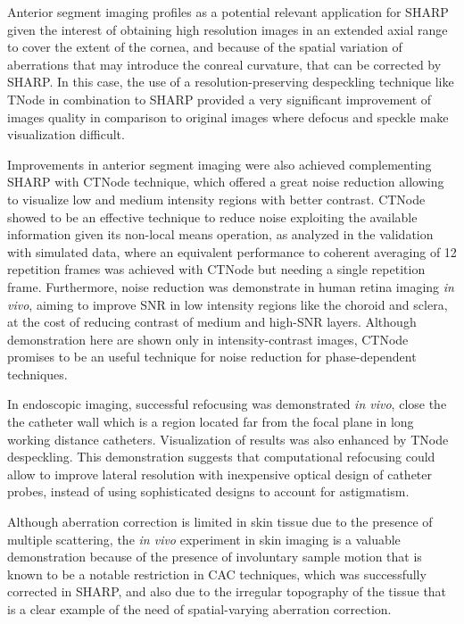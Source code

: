 Anterior segment imaging profiles as a potential relevant application for SHARP given the interest of obtaining high resolution images in an extended axial range to cover the extent of the cornea, and because of the spatial variation of aberrations that may introduce the conreal curvature, that can be corrected by SHARP. In this case, the use of a resolution-preserving despeckling technique like TNode in combination to SHARP provided a very significant improvement of images quality in comparison to original images where defocus and speckle make visualization difficult.

Improvements in anterior segment imaging were also achieved complementing SHARP with CTNode technique, which offered a great noise reduction allowing to visualize low and medium intensity regions with better contrast. CTNode showed to be an effective technique to reduce noise exploiting the available information given its non-local means operation, as analyzed in the validation with simulated data, where an equivalent performance to coherent averaging of 12 repetition frames was achieved with CTNode but needing a single repetition frame. Furthermore, noise reduction was demonstrate in human retina imaging \textit{in vivo}, aiming to improve SNR in low intensity regions like the choroid and sclera, at the cost of reducing contrast of medium and high-SNR layers. Although demonstration here are shown only in intensity-contrast images, CTNode promises to be an useful technique for noise reduction for phase-dependent techniques.

In endoscopic imaging, successful refocusing was demonstrated \textit{in vivo}, close the the catheter wall which is a region located far from the focal plane in long working distance catheters. Visualization of results was also enhanced by TNode despeckling. This demonstration suggests that computational refocusing could allow to improve lateral resolution with inexpensive optical design of catheter probes, instead of using sophisticated designs to account for astigmatism.

Although aberration correction is limited in skin tissue due to the presence of multiple scattering, the \textit{in vivo} experiment in skin imaging is a valuable demonstration because of the presence of involuntary sample motion that is known to be a notable restriction in CAC techniques, which was successfully corrected in SHARP, and also due to the irregular topography of the tissue that is a clear example of the need of spatial-varying aberration correction.

